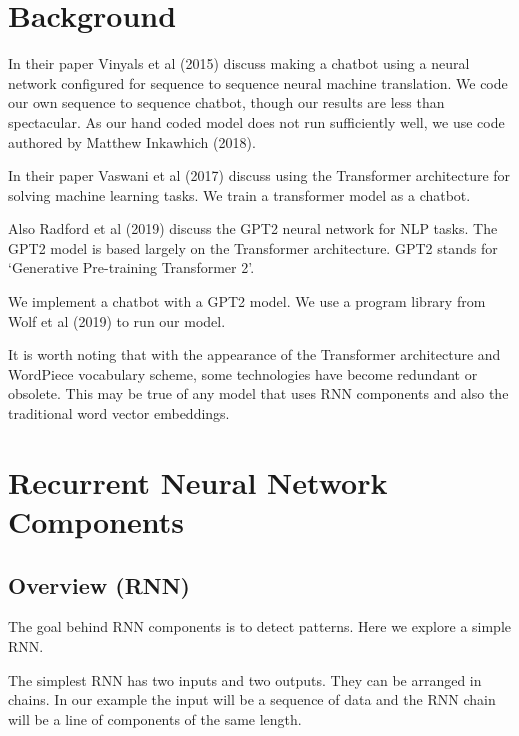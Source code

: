 

\section{Background}

In their paper Vinyals et al (2015)\cite{DBLP:journals/corr/VinyalsL15} discuss making a chatbot using
a neural network configured for sequence to sequence neural machine
translation. We code our own sequence to sequence chatbot, though our results are less than
spectacular. As our hand coded model does not run sufficiently well, we use code authored by Matthew Inkawhich (2018)\cite{2018Inkawhich}.

In their paper Vaswani et al (2017)\cite{Vaswani2017AttentionIA} discuss using the Transformer architecture for solving machine learning tasks. We train a transformer model as a chatbot.


Also Radford et al (2019)\cite{radford2019language} discuss the GPT2 neural network for NLP tasks. The GPT2 model is based largely on the Transformer architecture. GPT2 stands for `Generative Pre-training Transformer 2'. 

We implement a chatbot with a GPT2 model. We use a program library from Wolf et al (2019)\cite{Wolf2019HuggingFacesTS} to run our model.


It is worth noting that with the appearance of the Transformer architecture and WordPiece vocabulary scheme, some technologies have become redundant or obsolete. This may be true of any model that uses RNN components and also the traditional word vector embeddings.

\section{Recurrent Neural Network Components}

\subsection*{Overview (RNN)}
The goal behind RNN components is to detect patterns. Here we explore a simple \ac{RNN}.

The simplest RNN has two inputs and two outputs. They can be arranged in chains. In our example the input will be a sequence of data and the RNN chain will be a line of components of the same length.

